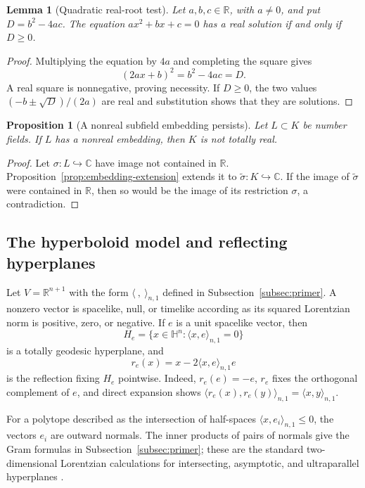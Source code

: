 \documentclass[11pt]{article}
\numberwithin{equation}{section}
\newtheorem{proposition}[theorem]{Proposition}
\newtheorem{lemma}[theorem]{Lemma}
\theoremstyle{definition}
\theoremstyle{remark}
\newcommand{\R}{\mathbb{R}}
\newcommand{\C}{\mathbb{C}}
\newcommand{\HH}{\mathbb{H}}
\begin{document}
\begin{lemma}[Quadratic real-root test]
\label{lem:quadratic-test}
Let \(a,b,c\in\R\), with \(a\ne0\), and put
\(D=b^2-4ac\).  The equation \(ax^2+bx+c=0\) has a real solution if and
only if \(D\ge0\).
\end{lemma}

\begin{proof}
Multiplying the equation by \(4a\) and completing the square gives
\[
 (2ax+b)^2=b^2-4ac=D.
\]
A real square is nonnegative, proving necessity.  If \(D\ge0\), the two
values \((-b\pm\sqrt D)/(2a)\) are real and substitution shows that they are
solutions.
\end{proof}

\begin{proposition}[A nonreal subfield embedding persists]
\label{prop:subfield-persists}
Let \(L\subset K\) be number fields.  If \(L\) has a nonreal embedding, then
\(K\) is not totally real.
\end{proposition}

\begin{proof}
Let \(\sigma:L\hookrightarrow\C\) have image not contained in \(\R\).
Proposition~\ref{prop:embedding-extension} extends it to
\(\widetilde\sigma:K\hookrightarrow\C\).  If the image of
\(\widetilde\sigma\) were contained in \(\R\), then so would be the image
of its restriction \(\sigma\), a contradiction.
\end{proof}

\subsection{The hyperboloid model and reflecting hyperplanes}

Let \(V=\R^{n+1}\) with the form \(\langle\ ,\ \rangle_{n,1}\) defined in
Subsection~\ref{subsec:primer}.  A nonzero vector is spacelike, null, or
timelike according as its squared Lorentzian norm is positive, zero, or
negative.  If \(e\) is a unit spacelike vector, then
\[
 H_e=\{x\in\HH^n:\langle x,e\rangle_{n,1}=0\}
\]
is a totally geodesic hyperplane, and
\[
 r_e(x)=x-2\langle x,e\rangle_{n,1}e
\]
is the reflection fixing \(H_e\) pointwise.  Indeed,
\(r_e(e)=-e\), \(r_e\) fixes the orthogonal complement of \(e\), and direct
expansion shows
\(\langle r_e(x),r_e(y)\rangle_{n,1}=\langle x,y\rangle_{n,1}\).

For a polytope described as the intersection of half-spaces
\(\langle x,e_i\rangle_{n,1}\le0\), the vectors \(e_i\) are outward normals.
The inner products of pairs of normals give the Gram formulas in
Subsection~\ref{subsec:primer}; these are the standard two-dimensional
Lorentzian calculations for intersecting, asymptotic, and ultraparallel
hyperplanes \cite[Chapter~3]{Ratcliffe}.
\end{document}
